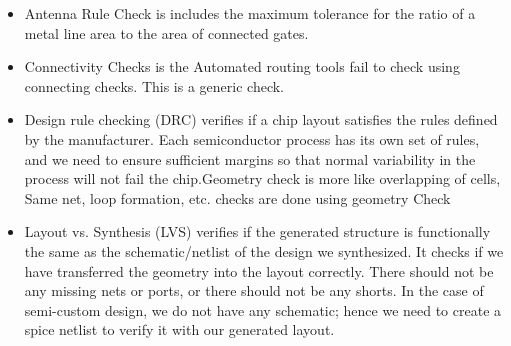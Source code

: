 \begin{itemize}
\item Antenna Rule Check is includes the maximum tolerance for the ratio of a metal line area to the area of connected gates.
\item Connectivity Checks is the Automated routing tools fail to check using connecting checks. This is a generic check.
\item Design rule checking (DRC) verifies if a chip layout satisfies the rules defined by the manufacturer. Each semiconductor process has its own set of rules, and we need to ensure sufficient margins so that normal variability in the process will not fail the chip.Geometry check is more like overlapping of cells, Same net, loop formation, etc. checks are done using geometry Check 
\item Layout vs. Synthesis (LVS) verifies if the generated structure is functionally the same as the schematic/netlist of the design we synthesized. It checks if we have transferred the geometry into the layout correctly. There should not be any missing nets or ports, or there should not be any shorts. In the case of semi-custom design, we do not have any schematic; hence we need to create a spice netlist to verify it with our generated layout.
\end{itemize}


